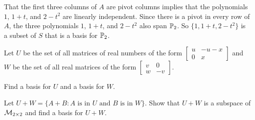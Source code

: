 \begin{example}
	
	That the first three columns of $A$ are pivot columns implies that the polynomials $1$, $1+t$, and $2-t^2$ are linearly independent. Since there is a pivot in every row of $A$, the three polynomials $1$, $1+t$, and $2-t^2$ also span $\mathbb{P}_2$. So $\{1, 1+t, 2-t^2\}$ is a subset of $S$ that is a basis for $\mathbb{P}_2$. 
	
	\ea

\end{example}

\begin{example} Let $U$ be the set of all matrices of real numbers of the form $\left[ \begin{array}{cc} u & -u-x \\  0 &   x \end{array} \right]$ and $W$ be the set of all real matrices of the form $\left[ \begin{array}{cc}   v &  0 \\ w & -v \end{array} \right]$. 
 	\ba
	\item Find a basis for $U$ and a basis for $W$.
	
	\item Let $U + W = \{A+B : A \text{ is in } U \text{ and } B \text{ is in } W\}$. Show that $U+W$ is a subspace of $\mathcal{M}_{2 \times 2}$ and find a basis for $U + W$.  

	\ea



\end{example}
